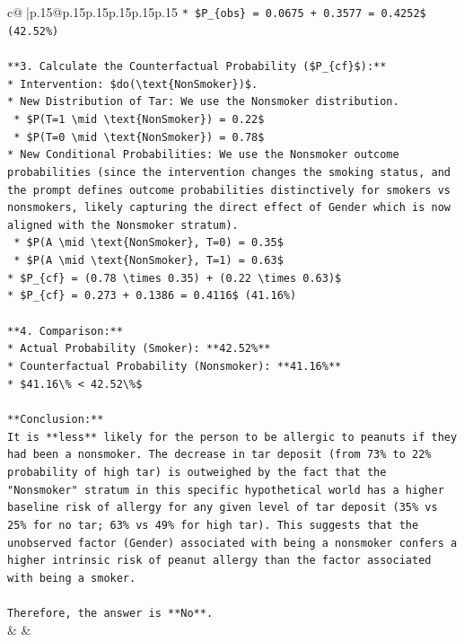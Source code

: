 \documentclass{article}
\begin{document}
{\begin{supertabular}{c@{$\;$}|p{.15\linewidth}@{}p{.15\linewidth}p{.15\linewidth}p{.15\linewidth}p{.15\linewidth}p{.15\linewidth}}
{{{\texttt{*   \$P\_\{obs\} = 0.0675 + 0.3577 = 0.4252\$ (42.52\%)} \\
\\ 
\texttt{**3. Calculate the Counterfactual Probability (\$P\_\{cf\}\$):**} \\
\texttt{*   Intervention: \$do(\textbackslash{}text\{NonSmoker\})\$.} \\
\texttt{*   New Distribution of Tar: We use the Nonsmoker distribution.} \\
\texttt{    *   \$P(T=1 \textbackslash{}mid \textbackslash{}text\{NonSmoker\}) = 0.22\$} \\
\texttt{    *   \$P(T=0 \textbackslash{}mid \textbackslash{}text\{NonSmoker\}) = 0.78\$} \\
\texttt{*   New Conditional Probabilities: We use the Nonsmoker outcome probabilities (since the intervention changes the smoking status, and the prompt defines outcome probabilities distinctively for smokers vs nonsmokers, likely capturing the direct effect of Gender which is now aligned with the Nonsmoker stratum).} \\
\texttt{    *   \$P(A \textbackslash{}mid \textbackslash{}text\{NonSmoker\}, T=0) = 0.35\$} \\
\texttt{    *   \$P(A \textbackslash{}mid \textbackslash{}text\{NonSmoker\}, T=1) = 0.63\$} \\
\texttt{*   \$P\_\{cf\} = (0.78 \textbackslash{}times 0.35) + (0.22 \textbackslash{}times 0.63)\$} \\
\texttt{*   \$P\_\{cf\} = 0.273 + 0.1386 = 0.4116\$ (41.16\%)} \\
\\ 
\texttt{**4. Comparison:**} \\
\texttt{*   Actual Probability (Smoker): **42.52\%**} \\
\texttt{*   Counterfactual Probability (Nonsmoker): **41.16\%**} \\
\texttt{*   \$41.16\textbackslash{}\% < 42.52\textbackslash{}\%\$} \\
\\ 
\texttt{**Conclusion:**} \\
\texttt{It is **less** likely for the person to be allergic to peanuts if they had been a nonsmoker. The decrease in tar deposit (from 73\% to 22\% probability of high tar) is outweighed by the fact that the "Nonsmoker" stratum in this specific hypothetical world has a higher baseline risk of allergy for any given level of tar deposit (35\% vs 25\% for no tar; 63\% vs 49\% for high tar). This suggests that the unobserved factor (Gender) associated with being a nonsmoker confers a higher intrinsic risk of peanut allergy than the factor associated with being a smoker.} \\
\\ 
\texttt{Therefore, the answer is **No**.} \\
            }
        }
    }
    & & \\ \\


\end{supertabular}}
\end{document}

